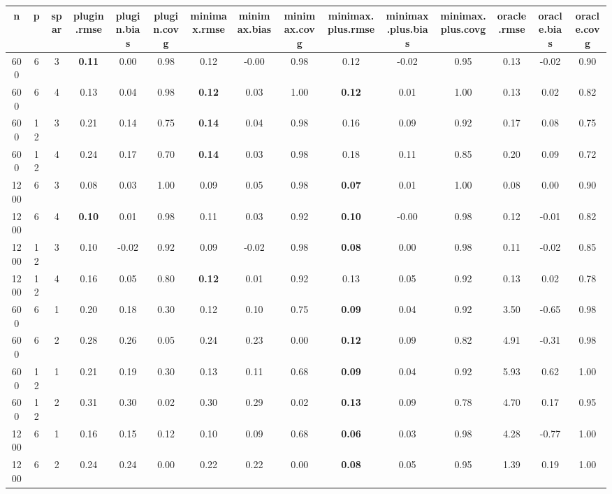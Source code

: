 \begin{table}[ht]
\centering
\begin{tabular}{||ccc||ccc|ccc|ccc|ccc}
  \hline
\hline
n & p & spar & plugin.rmse & plugin.bias & plugin.covg & minimax.rmse & minimax.bias & minimax.covg & minimax.plus.rmse & minimax.plus.bias & minimax.plus.covg & oracle.rmse & oracle.bias & oracle.covg \\ 
  \hline
\hline
600 & 6 & 3 & \bf 0.11 & 0.00 & 0.98 & 0.12 & -0.00 & 0.98 & 0.12 & -0.02 & 0.95 & 0.13 & -0.02 & 0.90 \\ 
  600 & 6 & 4 & 0.13 & 0.04 & 0.98 & \bf 0.12 & 0.03 & 1.00 & \bf 0.12 & 0.01 & 1.00 & 0.13 & 0.02 & 0.82 \\ 
  600 & 12 & 3 & 0.21 & 0.14 & 0.75 & \bf 0.14 & 0.04 & 0.98 & 0.16 & 0.09 & 0.92 & 0.17 & 0.08 & 0.75 \\ 
  600 & 12 & 4 & 0.24 & 0.17 & 0.70 & \bf 0.14 & 0.03 & 0.98 & 0.18 & 0.11 & 0.85 & 0.20 & 0.09 & 0.72 \\ 
   \hline
1200 & 6 & 3 & 0.08 & 0.03 & 1.00 & 0.09 & 0.05 & 0.98 & \bf 0.07 & 0.01 & 1.00 & 0.08 & 0.00 & 0.90 \\ 
  1200 & 6 & 4 & \bf 0.10 & 0.01 & 0.98 & 0.11 & 0.03 & 0.92 & \bf 0.10 & -0.00 & 0.98 & 0.12 & -0.01 & 0.82 \\ 
  1200 & 12 & 3 & 0.10 & -0.02 & 0.92 & 0.09 & -0.02 & 0.98 & \bf 0.08 & 0.00 & 0.98 & 0.11 & -0.02 & 0.85 \\ 
  1200 & 12 & 4 & 0.16 & 0.05 & 0.80 & \bf 0.12 & 0.01 & 0.92 & 0.13 & 0.05 & 0.92 & 0.13 & 0.02 & 0.78 \\ 
   \hline
\hline
600 & 6 & 1 & 0.20 & 0.18 & 0.30 & 0.12 & 0.10 & 0.75 & \bf 0.09 & 0.04 & 0.92 & 3.50 & -0.65 & 0.98 \\ 
  600 & 6 & 2 & 0.28 & 0.26 & 0.05 & 0.24 & 0.23 & 0.00 & \bf 0.12 & 0.09 & 0.82 & 4.91 & -0.31 & 0.98 \\ 
  600 & 12 & 1 & 0.21 & 0.19 & 0.30 & 0.13 & 0.11 & 0.68 & \bf 0.09 & 0.04 & 0.92 & 5.93 & 0.62 & 1.00 \\ 
  600 & 12 & 2 & 0.31 & 0.30 & 0.02 & 0.30 & 0.29 & 0.02 & \bf 0.13 & 0.09 & 0.78 & 4.70 & 0.17 & 0.95 \\ 
   \hline
1200 & 6 & 1 & 0.16 & 0.15 & 0.12 & 0.10 & 0.09 & 0.68 & \bf 0.06 & 0.03 & 0.98 & 4.28 & -0.77 & 1.00 \\ 
  1200 & 6 & 2 & 0.24 & 0.24 & 0.00 & 0.22 & 0.22 & 0.00 & \bf 0.08 & 0.05 & 0.95 & 1.39 & 0.19 & 1.00 \\ 

\end{tabular}
\end{table}
